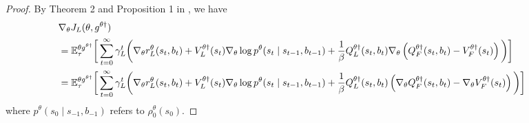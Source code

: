 \documentclass[letterpaper]{article} %
\providecommand{\E}{\mathbb{E}} %
\begin{document}
\begin{proof}
By Theorem 2 and Proposition 1 in \citet{Thoma2024-em}, we have 
\begin{subequations}
\begin{align}
    \MoveEqLeft[0]\nabla_{{\theta}}J_L({\theta}, g^{\theta\dagger})\nonumber\\
    &=\E_\tau^{\theta g^{\theta\dagger}}\bigg[\sum_{t=0}^\infty \gamma_L^t \bigg(\nabla_{\theta} r_L^{\theta}(s_t, b_t) 
    + V_L^{{\theta}\dagger}(s_t) \nabla_{\theta}\log
    p^{\theta} (s_{t} \mid s_{t-1}, b_{t-1}) + \frac{1}{\beta} Q_L^{{\theta}\dagger}(s_t, b_t)\nabla_{\theta} \left(Q_F^{{\theta} \dagger}(s_t, b_t) - V_F^{{\theta} \dagger}(s_t)\right)\bigg) \bigg]\\
    &=\E_\tau^{\theta g^{\theta\dagger}}\bigg[\sum_{t=0}^\infty \gamma_L^t \bigg(\nabla_{\theta} r_L^{\theta}(s_t, b_t) 
    + V_L^{{\theta}\dagger}(s_t) \nabla_{\theta}\log
    p^{\theta} (s_{t} \mid s_{t-1}, b_{t-1}) + \frac{1}{\beta} Q_L^{{\theta}\dagger}(s_t, b_t) \left(\nabla_{\theta}Q_F^{{\theta} \dagger}(s_t, b_t) - \nabla_{\theta}V_F^{{\theta} \dagger}(s_t)\right)\bigg) \bigg]\qquad \label{eq:thoma_hg}
\end{align}
\end{subequations}
where $p^{\theta}(s_0\mid s_{-1},b_{-1})$ refers to $\rho_0^{\theta}(s_0)$.


\end{proof}
\end{document}
